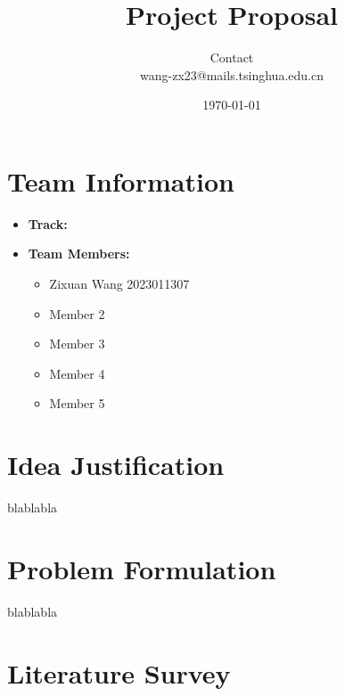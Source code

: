 \documentclass[10pt,twocolumn]{article}
\begin{document}
\title{\bf Project Proposal}
\author{Contact \\wang-zx23@mails.tsinghua.edu.cn}
\date{\today}

\maketitle
\thispagestyle{empty}

\section*{Team Information}
\begin{itemize}[leftmargin=*,noitemsep,topsep=0pt]
    \item \textbf{Track:} 
    \item \textbf{Team Members:} 
    \begin{itemize}[leftmargin=*,noitemsep,topsep=0pt]
        \item Zixuan Wang 2023011307
        \item Member 2 
        \item Member 3 
        \item Member 4 
        \item Member 5
    \end{itemize}
\end{itemize}

\section*{Idea Justification}
blablabla

\section*{Problem Formulation}
blablabla

\section*{Literature Survey}
\end{document}

